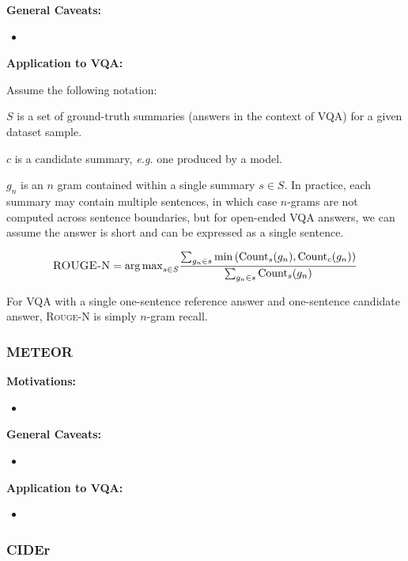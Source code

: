 \textbf{General Caveats:}

\begin{itemize}
    \item 
\end{itemize}

\textbf{Application to VQA:}

Assume the following notation:

\(S\) is a set of ground-truth summaries (answers in the context of VQA) for a given dataset sample.

\(c\) is a candidate summary, \textit{e.g.} one produced by a model.

\(g_n\) is an \(n\) gram contained within a single summary \(s \in S\). In practice, each summary may contain multiple sentences, in which case \(n\)-grams are not computed across sentence boundaries, but for open-ended VQA answers, we can assume the answer is short and can be expressed as a single sentence.

\begin{equation*}
    \textsc{ROUGE-N} = {\arg \max}_{s\in S} \frac{
        \sum_{g_n \in s} \min \left(\text{Count}_s(g_n), \text{Count}_c(g_n) \right)
    }{
        \sum_{g_n \in s} \text{Count}_s(g_n)
    }
\end{equation*}

For VQA with a single one-sentence reference answer and one-sentence candidate answer, \textsc{Rouge-N} is simply \(n\)-gram recall.

\subsubsection{METEOR}

\textbf{Motivations:}

\begin{itemize}
    \item 
\end{itemize}

\textbf{General Caveats:}

\begin{itemize}
    \item 
\end{itemize}

\textbf{Application to VQA:}
\begin{itemize}
    \item 
\end{itemize}

\subsubsection{CIDEr}

